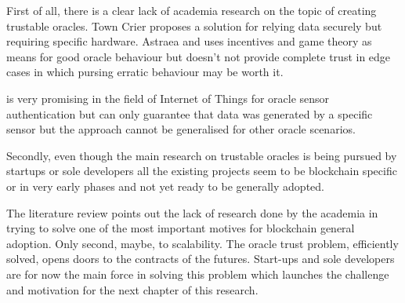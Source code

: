 First of all, there is a clear lack of academia research on the topic of creating trustable oracles. Town Crier proposes a solution for relying data securely but requiring specific hardware. Astraea and \cite{MontotoMonroy2018BitcoinBlockchain} uses incentives and game theory as means for good oracle behaviour but doesn't not provide complete trust in edge cases in which pursing erratic behaviour may be worth it.


\cite{Eberhardt2018Off-chainingComputations} is very promising in the field of Internet of Things for oracle sensor authentication but can only guarantee that data was generated by a specific sensor but the approach cannot be generalised for other oracle scenarios.

Secondly, even though the main research on trustable oracles is being pursued by startups or sole developers all the existing projects seem to be blockchain specific or in very early phases and not yet ready to be generally adopted.

The literature review points out the lack of research done by the academia in trying to solve one of the most important motives for blockchain general adoption. Only second, maybe, to scalability. The oracle trust problem, efficiently solved, opens doors to the contracts of the futures. Start-ups and sole developers are for now the main force in solving this problem which launches the challenge and motivation for the next chapter of this research.



